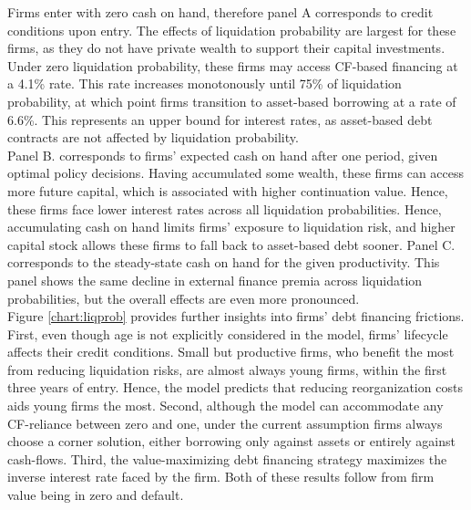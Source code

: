 \documentclass[12pt]{article}
\begin{document}
\noindent Firms enter with zero cash on hand, therefore panel A corresponds to credit conditions upon entry. The effects of liquidation probability are largest for these firms, as they do not have private wealth to support their capital investments. Under zero liquidation probability, these firms may access CF-based financing at a 4.1\% rate. This rate increases monotonously until 75\% of liquidation probability, at which point firms transition to asset-based borrowing at a rate of 6.6\%. This represents an upper bound for interest rates, as asset-based debt contracts are not affected by liquidation probability. \vspace{3mm} \\
Panel B. corresponds to firms' expected cash on hand after one period, given optimal policy decisions. Having accumulated some wealth, these firms can access more future capital, which is associated with higher continuation value. Hence, these firms face lower interest rates across all liquidation probabilities. Hence, accumulating cash on hand limits firms' exposure to liquidation risk, and higher capital stock allows these firms to fall back to asset-based debt sooner. Panel C. corresponds to the steady-state cash on hand for the given productivity. This panel shows the same decline in external finance premia across liquidation probabilities, but the overall effects are even more pronounced. \vspace{3mm} \\
Figure \ref{chart:liqprob} provides further insights into firms' debt financing frictions. First, even though age is not explicitly considered in the model, firms' lifecycle affects their credit conditions. Small but productive firms, who benefit the most from reducing liquidation risks, are almost always young firms, within the first three years of entry. Hence, the model predicts that reducing reorganization costs aids young firms the most. Second, although the model can accommodate any CF-reliance between zero and one, under the current assumption firms always choose a corner solution, either borrowing only against assets or entirely against cash-flows. Third, the value-maximizing debt financing strategy maximizes the inverse interest rate faced by the firm. Both of these results follow from firm value being in zero and default. 
\end{document}
